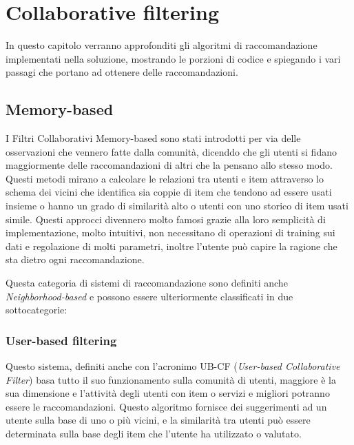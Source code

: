 \chapter{Collaborative filtering}
\label{chp:03-recommendationSystems}
In questo capitolo verranno approfonditi gli algoritmi di raccomandazione implementati nella soluzione, mostrando le porzioni di 
codice e spiegando i vari passagi che portano ad ottenere delle raccomandazioni.


\section{Memory-based} 
I Filtri Collaborativi Memory-based sono stati introdotti per via delle osservazioni che vennero fatte dalla comunità, dicenddo che
gli utenti si fidano maggiormente delle raccomandazioni di altri che la pensano allo stesso modo. Questi metodi mirano a calcolare 
le relazioni tra utenti e item attraverso lo schema dei vicini che identifica sia coppie di item che tendono ad essere usati insieme 
o hanno un grado di similarità alto o utenti con uno storico di item usati simile. \cite{taxonomy-of-recommender-agents-on-the-internet}
Questi approcci divennero molto famosi grazie alla loro semplicità di implementazione, molto intuitivi, non necessitano di operazioni
di training sui dati e regolazione di molti parametri, inoltre l'utente può capire la ragione che sta dietro ogni raccomandazione. 

Questa categoria di sistemi di raccomandazione sono definiti anche \\\textit{Neighborhood-based} e possono essere ulteriormente classificati 
in due sottocategorie:


\subsection{User-based filtering} 
Questo sistema, definiti anche con l'acronimo UB-CF (\textit{User-based Collaborative Filter}) basa tutto il suo funzionamento sulla 
comunità di utenti, maggiore è la sua dimensione e l'attività degli utenti con item o servizi e migliori potranno essere le 
raccomandazioni. Questo algoritmo fornisce dei suggerimenti ad un utente sulla base di uno o più vicini, e la similarità tra utenti può
essere determinata sulla base degli item che l'utente ha utilizzato o valutato.

